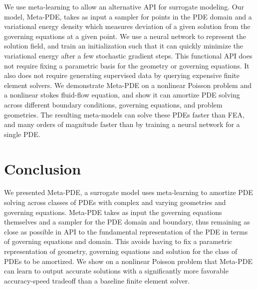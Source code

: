 \documentclass{puthesis}
\begin{document}
We use meta-learning to allow an alternative API for surrogate modeling.
Our model, Meta-PDE, takes as input a sampler for points in the PDE domain and
a variational energy density which measures deviation of a
given solution from the governing equations at a given point.
We use a neural network to represent the solution field, and train an initialization such that
it can quickly minimize the variational energy after a few stochastic gradient steps.
This functional API does not require fixing a parametric basis for the geometry or
governing equations.
It also does not require generating supervised data by
querying expensive finite element solvers.
We demonstrate Meta-PDE on a nonlinear Poisson problem and a nonlinear stokes
fluid-flow equation, and show it can amortize PDE solving
across different boundary conditions, governing equations,
and problem geometries.
The resulting meta-models can solve these PDEs faster than FEA,
and many orders of magnitude faster than by
training a neural network for a single PDE.







% 
\section{Conclusion}
We presented Meta-PDE, a surrogate model uses meta-learning to amortize PDE solving
across classes of PDEs with complex and varying geometries and governing equations.
Meta-PDE takes as input the governing equations themselves and a sampler for the
PDE domain and boundary, thus remaining as close as possible in API to the fundamental
representation of the PDE in terms of governing equations and domain.
This avoids having to fix a parametric representation of geometry, governing equations
and solution for the class of PDEs to be amortized.
We show on a nonlinear Poisson problem that Meta-PDE can learn to output accurate
solutions with a significantly more favorable accuracy-speed tradeoff than
a baseline finite element solver.
\end{document}
